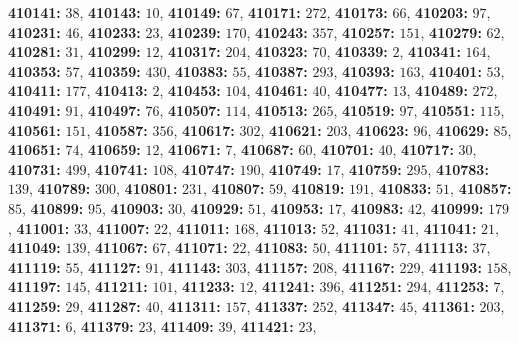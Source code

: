 \textsf{\bfseries 410141:} $38$, \textsf{\bfseries 410143:} $10$, \textsf{\bfseries 410149:} $67$, \textsf{\bfseries 410171:} $272$, \textsf{\bfseries 410173:} $66$, \textsf{\bfseries 410203:} $97$, \textsf{\bfseries 410231:} $46$, \textsf{\bfseries 410233:} $23$, \textsf{\bfseries 410239:} $170$, \textsf{\bfseries 410243:} $357$, \textsf{\bfseries 410257:} $151$, \textsf{\bfseries 410279:} $62$, \textsf{\bfseries 410281:} $31$, \textsf{\bfseries 410299:} $12$, \textsf{\bfseries 410317:} $204$, \textsf{\bfseries 410323:} $70$, \textsf{\bfseries 410339:} $2$, \textsf{\bfseries 410341:} $164$, \textsf{\bfseries 410353:} $57$, \textsf{\bfseries 410359:} $430$, \textsf{\bfseries 410383:} $55$, \textsf{\bfseries 410387:} $293$, \textsf{\bfseries 410393:} $163$, \textsf{\bfseries 410401:} $53$, \textsf{\bfseries 410411:} $177$, \textsf{\bfseries 410413:} $2$, \textsf{\bfseries 410453:} $104$, \textsf{\bfseries 410461:} $40$, \textsf{\bfseries 410477:} $13$, \textsf{\bfseries 410489:} $272$, \textsf{\bfseries 410491:} $91$, \textsf{\bfseries 410497:} $76$, \textsf{\bfseries 410507:} $114$, \textsf{\bfseries 410513:} $265$, \textsf{\bfseries 410519:} $97$, \textsf{\bfseries 410551:} $115$, \textsf{\bfseries 410561:} $151$, \textsf{\bfseries 410587:} $356$, \textsf{\bfseries 410617:} $302$, \textsf{\bfseries 410621:} $203$, \textsf{\bfseries 410623:} $96$, \textsf{\bfseries 410629:} $85$, \textsf{\bfseries 410651:} $74$, \textsf{\bfseries 410659:} $12$, \textsf{\bfseries 410671:} $7$, \textsf{\bfseries 410687:} $60$, \textsf{\bfseries 410701:} $40$, \textsf{\bfseries 410717:} $30$, \textsf{\bfseries 410731:} $499$, \textsf{\bfseries 410741:} $108$, \textsf{\bfseries 410747:} $190$, \textsf{\bfseries 410749:} $17$, \textsf{\bfseries 410759:} $295$, \textsf{\bfseries 410783:} $139$, \textsf{\bfseries 410789:} $300$, \textsf{\bfseries 410801:} $231$, \textsf{\bfseries 410807:} $59$, \textsf{\bfseries 410819:} $191$, \textsf{\bfseries 410833:} $51$, \textsf{\bfseries 410857:} $85$, \textsf{\bfseries 410899:} $95$, \textsf{\bfseries 410903:} $30$, \textsf{\bfseries 410929:} $51$, \textsf{\bfseries 410953:} $17$, \textsf{\bfseries 410983:} $42$, \textsf{\bfseries 410999:} $179$, \textsf{\bfseries 411001:} $33$, \textsf{\bfseries 411007:} $22$, \textsf{\bfseries 411011:} $168$, \textsf{\bfseries 411013:} $52$, \textsf{\bfseries 411031:} $41$, \textsf{\bfseries 411041:} $21$, \textsf{\bfseries 411049:} $139$, \textsf{\bfseries 411067:} $67$, \textsf{\bfseries 411071:} $22$, \textsf{\bfseries 411083:} $50$, \textsf{\bfseries 411101:} $57$, \textsf{\bfseries 411113:} $37$, \textsf{\bfseries 411119:} $55$, \textsf{\bfseries 411127:} $91$, \textsf{\bfseries 411143:} $303$, \textsf{\bfseries 411157:} $208$, \textsf{\bfseries 411167:} $229$, \textsf{\bfseries 411193:} $158$, \textsf{\bfseries 411197:} $145$, \textsf{\bfseries 411211:} $101$, \textsf{\bfseries 411233:} $12$, \textsf{\bfseries 411241:} $396$, \textsf{\bfseries 411251:} $294$, \textsf{\bfseries 411253:} $7$, \textsf{\bfseries 411259:} $29$, \textsf{\bfseries 411287:} $40$, \textsf{\bfseries 411311:} $157$, \textsf{\bfseries 411337:} $252$, \textsf{\bfseries 411347:} $45$, \textsf{\bfseries 411361:} $203$, \textsf{\bfseries 411371:} $6$, \textsf{\bfseries 411379:} $23$, \textsf{\bfseries 411409:} $39$, \textsf{\bfseries 411421:} $23$, 
